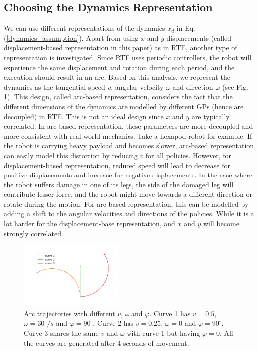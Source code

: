 \subsection{Choosing the Dynamics Representation}
We can use different representations of the dynamics $x_d$ in Eq. (\ref{dynamics_assumption}).
Apart from using $x$ and $y$ displacements (called displacement-based representation in this paper) as in RTE, another type of representation is investigated.
Since RTE uses periodic controllers, the robot will experience the same displacement and rotation during each period, and the execution should result in an arc.
Based on this analysis, we represent the dynamics as the tangential speed $v$, angular velocity $\omega$ and direction $\varphi$ (see Fig. \ref{arcs}). 
This design, called arc-based representation, considers the fact that the different dimensions of the dynamics are modelled by different GPs (hence are decoupled) in RTE.
This is not an ideal design since $x$ and $y$ are typically correlated.
In arc-based representation, these parameters are more decoupled and more consistent with real-world mechanics. 
Take a hexapod robot for example.
If the robot is carrying heavy payload and becomes slower, arc-based representation can easily model this distortion by reducing $v$ for all policies. However, for displacement-based representation, reduced speed will lead to decrease for positive displacements and increase for negative displacements.
In the case where the robot suffers damage in one of its legs, the side of the damaged leg will contribute lesser force, and the robot might move towards a different direction or rotate during the motion.
For arc-based representation, this can be modelled by adding a shift to the angular velocities and directions of the policies.
While it is a lot harder for the displacement-base representation, and $x$ and $y$ will become strongly correlated.
\begin{figure}[h]
\centering
\includegraphics[width=0.45\textwidth]{example_curves.pdf}
\caption{Arc trajectories with different $v$, $\omega$ and $\varphi$. Curve 1 has $v=0.5$, $\omega = 30^\circ/s$ and $\varphi = 90^\circ$. Curve 2 has $v=0.25$, $\omega = 0$ and $\varphi = 90^\circ$.
Curve 3 shares the same $v$ and $\omega$ with curve 1 but having $\varphi = 0$.
All the curves are generated after 4 seconds of movement.
}
\label{arcs}
\end{figure}

